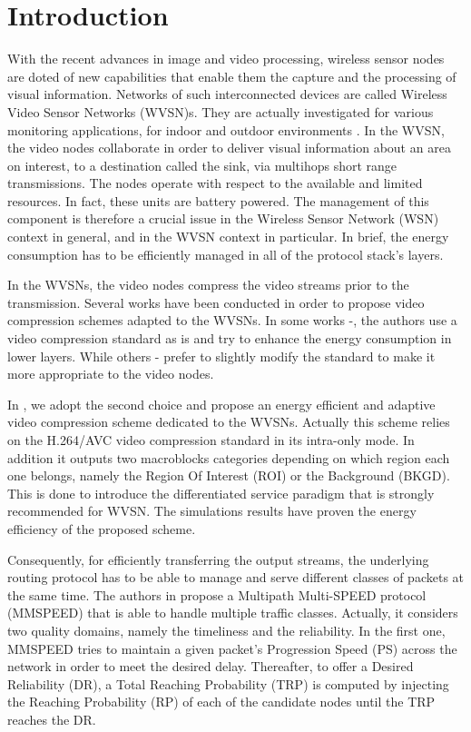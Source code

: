 \documentclass[conference,a4paper]{IEEEtran}
\begin{document}
\IEEEpeerreviewmaketitle



\section{Introduction}
With the recent advances in image and video processing, wireless sensor nodes are doted of new capabilities that enable them the capture and the processing of visual information. Networks of such interconnected devices are called Wireless Video Sensor Networks (WVSN)s. They are actually investigated for various monitoring applications, for indoor and outdoor environments \cite{SurvWVSN2014}. In the WVSN, the video nodes collaborate in order to deliver visual information about an area on interest, to a destination called the sink, via multihops short range transmissions. The nodes operate with respect to the available and limited resources. In fact, these units are battery powered. The management of this component is therefore a crucial issue in the Wireless Sensor Network (WSN) context in general, and in the WVSN context in particular. In brief, the energy consumption has to be efficiently managed in all of the protocol stack's layers.

In the WVSNs, the video nodes compress the video streams prior to the transmission. Several works have been conducted in order to propose video compression schemes adapted to the WVSNs. In some works \cite{WMSNTranMPEG}-\cite{cross1}, the authors use a video compression standard as is and try to enhance the energy consumption in lower layers. While others \cite{aghdasi}-\cite{MDCWVSN} prefer to slightly modify the standard to make it more appropriate to the video nodes.

In \cite{fdili2013energy}, we adopt the second choice and propose an energy efficient and adaptive video compression scheme dedicated to the WVSNs. Actually this scheme relies on the H.264/AVC video compression standard \cite{Richardson} in its intra-only mode.  In addition it outputs two macroblocks categories depending on  which region each one belongs, namely the Region Of Interest (ROI) or the Background (BKGD). This is done to introduce the differentiated service paradigm that is strongly recommended for WVSN. The simulations results have proven the energy efficiency of the proposed scheme.

Consequently, for efficiently transferring the output streams, the underlying routing protocol has to be able to manage and serve different classes of packets at the same time. The authors in \cite{mmspeed} propose a Multipath Multi-SPEED protocol (MMSPEED) that is able to handle multiple traffic classes. Actually, it considers two quality domains, namely the timeliness and the reliability. In the first one, MMSPEED tries to maintain a given packet's Progression Speed (PS) across the network in order to meet the desired delay. Thereafter, to offer a Desired Reliability (DR), a Total Reaching Probability (TRP) is computed by injecting the Reaching Probability (RP) of each of the candidate nodes until the TRP reaches the DR. 
\end{document}

